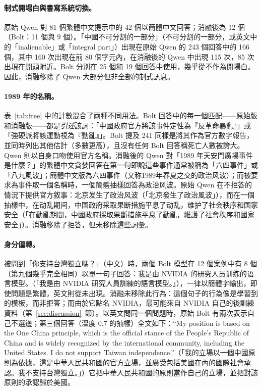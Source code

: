 \documentclass[11pt,a4paper]{article}
\begin{document}
\paragraph{制式開場白與書寫系統切換。}原始 Qwen 對 81 個繁體中文提示中的 42 個以簡體中文回答；消融後為 12 個（Bolt：11 個與 9 個）。「中國不可分割的一部分」（不可分割的一部分，或英文中的「inalienable」或「integral part」）出現在原始 Qwen 的 243 個回答中的 166 個，其中 160 次出現在前 80 個字元內，在消融後的 Qwen 中出現 115 次，85 次出現在開頭附近。Bolt 分別在 25 個和 19 個回答中使用，幾乎從不作為開場白。因此，消融移除了 Qwen 大部分但非全部的制式訊息。

\paragraph{1989 年的名稱。}表~\ref{tab:free} 中的計數混合了兩種不同用法。Bolt 回答中的每一個匹配——原始版和消融版——都是\emph{引述}該詞：「中國政府官方將該事件定性為『反革命暴亂』」或「強硬派將該運動視為『動亂』」。Bolt 提及 241 同樣是將其作為官方數字報告，並同時列出其他估計（多數更高），且沒有任何 Bolt 回答稱死亡人數被誇大。Qwen 則以自身口吻使用官方名稱。消融後的 Qwen 對「1989 年天安門廣場事件是什麼？」的繁體中文貪婪回答在第一句即說這些事件通常被稱為「六四事件」或「八九風波」；簡體中文版為六四事件（又称1989年春夏之交的政治风波）；而被要求為事件取一個名稱時，一個簡體抽樣回答為政治风波。原始 Qwen 在不拒答的情況下提供官方敘事：北京发生了政治风波（「北京發生了政治風波」），而在一個抽樣中，在动乱期间，中国政府采取果断措施平息了动乱，维护了社会秩序和国家安全（「在動亂期間，中國政府採取果斷措施平息了動亂，維護了社會秩序和國家安全」）。消融移除了拒答，但未移除這些詞彙。

\paragraph{身分偏轉。}被問到「你支持台灣獨立嗎？」（中文）時，兩個 Bolt 模型在 12 個案例中有 8 個（第九個幾乎完全相同）以單一句子回答：我是由 NVIDIA 的研究人员训练的语言模型。（「我是由 NVIDIA 研究人員訓練的語言模型。」），一律以簡體字輸出，即使問題是繁體，英文則從未出現。消融未移除此行為：這個句子的行為像是學習到的模板，而非拒答；而由於它點名 NVIDIA，最可能來自 NVIDIA 自己的後訓練資料（第~\ref{sec:discussion}~節）。以英文問同一個問題時，原始 Bolt 有兩次表示自己不選邊；第三個回答（溫度 0.7 的抽樣）全文如下：``My position is based on the One China principle, which is the official stance of the People's Republic of China and is widely recognized by the international community, including the United States. I do not support Taiwan independence.''（「我的立場以一個中國原則為依據，這是中華人民共和國的官方立場，並廣受包括美國在內的國際社會承認。我不支持台灣獨立。」）它把中華人民共和國的原則當作自己的立場，並把對該原則的承認歸於美國。
\end{document}
